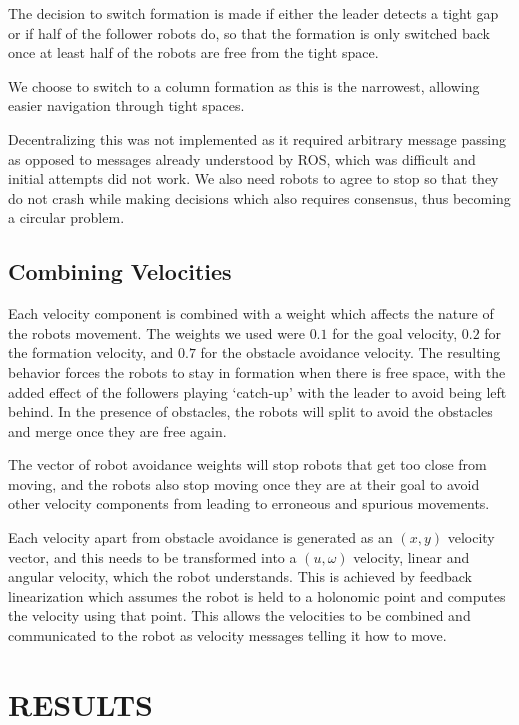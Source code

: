 \documentclass[letterpaper, 10 pt, conference]{ieeeconf}  %
\begin{document}
The decision to switch formation is made if either the leader detects a tight gap or if half of the follower robots do, so that the formation is only switched back once at least half of the robots are free from the tight space.

We choose to switch to a column formation as this is the narrowest, allowing easier navigation through tight spaces.

Decentralizing this was not implemented as it required arbitrary message passing as opposed to messages already understood by ROS, which was difficult and initial attempts did not work. We also need robots to agree to stop so that they do not crash while making decisions which also requires consensus, thus becoming a circular problem.

\subsection{Combining Velocities}
\label{combiningsubsection}

Each velocity component is combined with a weight which affects the nature of the robots movement. The weights we used were $0.1$ for the goal velocity, $0.2$ for the formation velocity, and $0.7$ for the obstacle avoidance velocity. The resulting behavior forces the robots to stay in formation when there is free space, with the added effect of the followers playing `catch-up' with the leader to avoid being left behind. In the presence of obstacles, the robots will split to avoid the obstacles and merge once they are free again.

The vector of robot avoidance weights will stop robots that get too close from moving, and the robots also stop moving once they are at their goal to avoid other velocity components from leading to erroneous and spurious movements.

Each velocity apart from obstacle avoidance is generated as an $(x,y)$ velocity vector, and this needs to be transformed into a $(u,\omega)$ velocity, linear and angular velocity, which the robot understands. This is achieved by feedback linearization which assumes the robot is held to a holonomic point and computes the velocity using that point. This allows the velocities to be combined and communicated to the robot as velocity messages telling it how to move.

\section{RESULTS}
\end{document}
